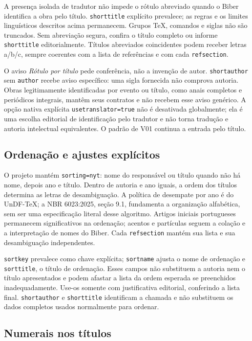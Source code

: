 A presença isolada de tradutor não impede o rótulo abreviado quando o
Biber identifica a obra pelo título. \texttt{shorttitle} explícito prevalece;
as regras e os limites linguísticos descritos acima permanecem. Grupos TeX,
comandos e siglas não são truncados. Sem abreviação segura, confira o título
completo ou informe \texttt{shorttitle} editorialmente. Títulos abreviados
coincidentes podem receber letras a/b/c, sempre coerentes com a lista de
referências e com cada \texttt{refsection}.

O aviso \emph{Rótulo por título} pede conferência, não a invenção de autor.
\texttt{shortauthor} sem \texttt{author} recebe aviso específico: uma sigla
fornecida não comprova autoria. Obras legitimamente identificadas por evento
ou título, como anais completos e periódicos integrais, mantêm seus contratos
e não recebem esse aviso genérico. A opção nativa explícita
\texttt{usetranslator=true} não é desativada globalmente; ela é uma escolha
editorial de identificação pelo tradutor e não torna tradução e autoria
intelectual equivalentes. O padrão de V01 continua a entrada pelo título.

\subsection*{Ordenação e ajustes explícitos}

O projeto mantém \texttt{sorting=nyt}: nome do responsável ou título
quando não há nome, depois ano e título. Dentro de autoria e ano iguais,
a ordem dos títulos determina as letras de desambiguação. A política de
desempate por ano é do UnDF-TeX; a NBR 6023:2025, seção 9.1, fundamenta
a organização alfabética, sem ser uma especificação literal desse algoritmo.
Artigos iniciais portugueses permanecem significativos na ordenação;
acentos e partículas seguem a colação e a interpretação de nomes do Biber.
Cada \texttt{refsection} mantém sua lista e sua desambiguação independentes.

\texttt{sortkey} prevalece como chave explícita; \texttt{sortname} ajusta
o nome de ordenação e \texttt{sorttitle}, o título de ordenação.
Esses campos não substituem a autoria nem o título apresentados e podem
afastar a lista da ordem esperada se preenchidos inadequadamente.
Use-os somente com justificativa editorial, conferindo a lista final.
\texttt{shortauthor} e \texttt{shorttitle} identificam a chamada e não
substituem os dados completos usados normalmente para ordenar.

\subsection*{Numerais nos títulos}

